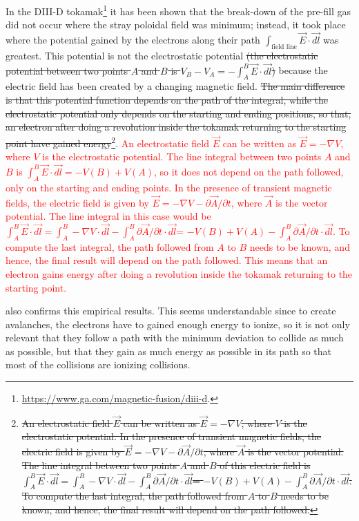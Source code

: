 \documentclass[a4paper,12pt,oneside]{book}
\newcommand{\p}{\partial}
\begin{document}
In the DIII-D tokamak\footnote{\url{https://www.ga.com/magnetic-fusion/diii-d}.} it has been shown \cite{Lazarus_1998} that the break-down of the pre-fill gas did not occur where the stray poloidal field was minimum; instead, it took place where the potential gained by the electrons along their path $\int_\text{field line} \vec{E} \cdot \vec{dl}$ was greatest. This potential is not the electrostatic potential \st{(the electrostatic potential between two points $A$ and $B$ is $V_B-V_A=- \int_A^B \vec{E} \cdot \vec{dl}$)} because the electric field has been created by a changing magnetic field. \st{The main difference is that this potential function depends on the path of the integral, while the electrostatic potential only depends on the starting and ending positions, so that, an electron after doing a revolution inside the tokamak returning to the starting point have gained energy}\footnote{\st{An electrostatic field $\vec{E}$ can be written as  $\vec{E}=-\nabla V$, where $V$ is the electrostatic potential. In the presence of transient magnetic fields, the electric field is given by $\vec{E}=-\nabla V- \p \vec{A}/ \p t$, where $\vec{A}$ is the vector potential. The line integral between two points $A$ and $B$ of this electric field is
$\int_A^B \vec{E} \cdot \vec{dl}=\int_A^B -\nabla V \cdot \vec{dl} -\int_A^B \p \vec{A}/ \p t \cdot \vec{dl}$= $-V(B)+V(A)-\int_A^B \p \vec{A}/ \p t \cdot \vec{dl}$. To compute the last integral, the path followed from $A$ to $B$ needs to be known, and hence, the final result will depend on the path followed.}}. \textcolor{red}{An electrostatic field $\vec{E}$ can be written as  $\vec{E}=-\nabla V$, where $V$ is the electrostatic potential. The line integral between two points $A$ and $B$ is $\int_A^B \vec{E} \cdot \vec{dl}=-V(B)+V(A)$, so it does not depend on the path followed, only on the starting and ending points. In the presence of transient magnetic fields, the electric field is given by $\vec{E}=-\nabla V- \p \vec{A}/ \p t$, where $\vec{A}$ is the vector potential. The line integral in this case would be
$\int_A^B \vec{E} \cdot \vec{dl}=\int_A^B -\nabla V \cdot \vec{dl} -\int_A^B \p \vec{A}/ \p t \cdot \vec{dl}$= $-V(B)+V(A)-\int_A^B \p \vec{A}/ \p t \cdot \vec{dl}$. To compute the last integral, the path followed from $A$ to $B$ needs to be known, and hence, the final result will depend on the path followed. This means that an electron gains energy after doing a revolution inside the tokamak returning to the starting point.}


\cite{NSTX_2017} also confirms this empirical results. This seems understandable since to create avalanches, the electrons have to gained enough energy to ionize, so it is not only relevant that they follow a path with the minimum deviation to collide as much as possible, but that they gain as much energy as possible in its path so that most of the collisions are ionizing collisions.
\end{document}
